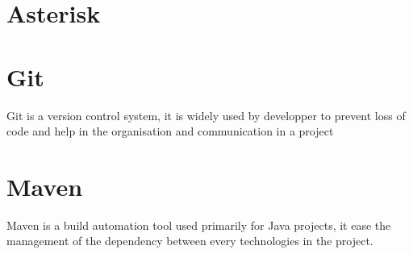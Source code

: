 \section{Asterisk}



\section{Git}

Git is a version control system, it is widely used by developper to prevent loss of code and help in the organisation and communication in a project


\section{Maven}

Maven is a build automation tool used primarily for Java projects, it ease the management of the dependency between every technologies in the project.

